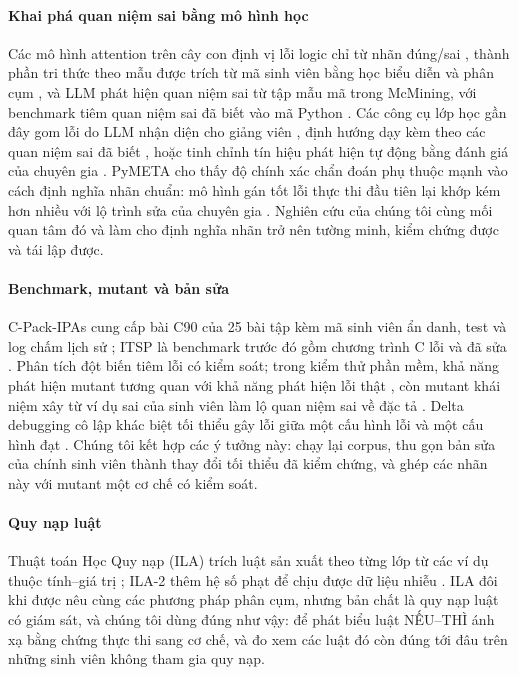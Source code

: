 \documentclass[a4paper,preprint,12pt,authoryear]{elsarticle}
\begin{document}
\paragraph{Khai phá quan niệm sai bằng mô hình học}
Các mô hình attention trên cây con định vị lỗi logic chỉ từ nhãn đúng/sai \citep{hoq2025sann}, thành phần tri thức theo mẫu được trích từ mã sinh viên bằng học biểu diễn và phân cụm \citep{edm2026patternkc}, và LLM phát hiện quan niệm sai từ tập mẫu mã trong McMining, với benchmark tiêm quan niệm sai đã biết vào mã Python \citep{alhossami2026mcmining}. Các công cụ lớp học gần đây gom lỗi do LLM nhận diện cho giảng viên \citep{sigcse2026realtime}, định hướng dạy kèm theo các quan niệm sai đã biết \citep{sigcse2026tutor}, hoặc tinh chỉnh tín hiệu phát hiện tự động bằng đánh giá của chuyên gia \citep{aruleba2026ukicer}. PyMETA cho thấy độ chính xác chẩn đoán phụ thuộc mạnh vào cách định nghĩa nhãn chuẩn: mô hình gán tốt lỗi thực thi đầu tiên lại khớp kém hơn nhiều với lộ trình sửa của chuyên gia \citep{li2026pymeta}. Nghiên cứu của chúng tôi cùng mối quan tâm đó và làm cho định nghĩa nhãn trở nên tường minh, kiểm chứng được và tái lập được.

\paragraph{Benchmark, mutant và bản sửa}
C-Pack-IPAs cung cấp bài C90 của 25 bài tập kèm mã sinh viên ẩn danh, test và log chấm lịch sử \citep{orvalho2024cpack}; ITSP là benchmark trước đó gồm chương trình C lỗi và đã sửa \citep{yi2017itsp}. Phân tích đột biến tiêm lỗi có kiểm soát; trong kiểm thử phần mềm, khả năng phát hiện mutant tương quan với khả năng phát hiện lỗi thật \citep{just2014mutants}, còn mutant khái niệm xây từ ví dụ sai của sinh viên làm lộ quan niệm sai về đặc tả \citep{prasad2024conceptual}. Delta debugging cô lập khác biệt tối thiểu gây lỗi giữa một cấu hình lỗi và một cấu hình đạt \citep{zeller2002ddmin}. Chúng tôi kết hợp các ý tưởng này: chạy lại corpus, thu gọn bản sửa của chính sinh viên thành thay đổi tối thiểu đã kiểm chứng, và ghép các nhãn này với mutant một cơ chế có kiểm soát.

\paragraph{Quy nạp luật}
Thuật toán Học Quy nạp (ILA) trích luật sản xuất theo từng lớp từ các ví dụ thuộc tính--giá trị \citep{tolun1998ila}; ILA-2 thêm hệ số phạt để chịu được dữ liệu nhiễu \citep{tolun1999ila2}. ILA đôi khi được nêu cùng các phương pháp phân cụm, nhưng bản chất là quy nạp luật có giám sát, và chúng tôi dùng đúng như vậy: để phát biểu luật NẾU--THÌ ánh xạ bằng chứng thực thi sang cơ chế, và đo xem các luật đó còn đúng tới đâu trên những sinh viên không tham gia quy nạp.
\end{document}
